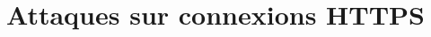\documentclass[a4paper,12pt]{memoir}
\title{Attaques sur connexions HTTPS}
\begin{document}
\maketitle

\newpage

\tableofcontents*

\newpage














\end{document}
